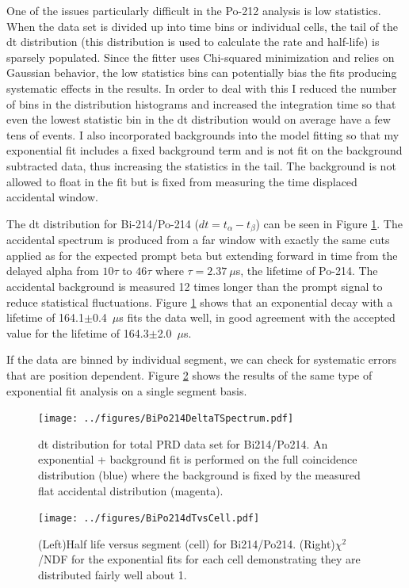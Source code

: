 One of the issues particularly difficult in the Po-212 analysis is low statistics. When the data set is divided up into time bins or individual cells, the tail of the dt distribution (this distribution is used to calculate the rate and half-life) is sparsely populated. Since the fitter uses Chi-squared minimization and relies on Gaussian behavior, the low statistics bins can potentially bias the fits producing systematic effects in the results. In order to deal with this I reduced the number of bins in the distribution histograms and increased the integration time so that even the lowest statistic bin in the dt distribution would on average have a few tens of events. I also incorporated backgrounds into the model fitting so that my exponential fit includes a fixed background term and is not fit on the background subtracted data, thus increasing the statistics in the tail. The background is not allowed to float in the fit but is fixed from measuring the time displaced accidental window. 

The dt distribution for Bi-214/Po-214 ($dt=t_{\alpha}-t_{\beta}$) can be seen in Figure \ref{fig:Po214dtcum}. The accidental spectrum is produced from a far window with exactly the same cuts applied as for the expected prompt beta but extending forward in time from the delayed alpha from $10\tau$ to $46\tau$ where $\tau=2.37~\mu$s, the lifetime of Po-214. The accidental background is measured 12 times longer than the prompt signal to reduce statistical fluctuations. Figure \ref{fig:Po214dtcum} shows that an exponential decay with a lifetime of 164.1$\pm$0.4~$\mu$s fits the data well, in good agreement with the accepted value for the lifetime of 164.3$\pm$2.0~$\mu$s. 

If the data are binned by individual segment, we can check for systematic errors that are position dependent. Figure \ref{fig:Po214thalfvscell} shows the results of the same type of exponential fit analysis on a single segment basis.  
\begin{figure}[!h]
\centering
\texttt{[image: ../figures/BiPo214DeltaTSpectrum.pdf]}
\caption{\label{fig:Po214dtcum}dt distribution for total PRD data set for Bi214/Po214. An exponential + background fit is performed on the full coincidence distribution (blue) where the background is fixed by the measured flat accidental distribution (magenta). }
\end{figure}

\begin{figure}[!h]
\centering
\texttt{[image: ../figures/BiPo214dTvsCell.pdf]}
\caption{\label{fig:Po214thalfvscell}(Left)Half life versus segment (cell) for Bi214/Po214. (Right)$\chi^2$/NDF for the exponential fits for each cell demonstrating they are distributed fairly well about 1.}
\end{figure}

